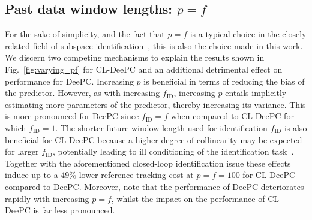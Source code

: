 \subsection{Past data window lengths: $p=f$}
\noindent For the sake of simplicity, and the fact that $p=f$ is a typical choice in the closely related field of subspace identification~\citep{vanderVeen2013}, this is also the choice made in this work. We discern two competing mechanisms to explain the results shown in Fig.~\ref{fig:varying_pf} for \ac{CL-DeePC} and an additional detrimental effect on performance for \ac{DeePC}. Increasing $p$ is beneficial in terms of reducing the bias of the predictor. However, as with increasing $f_\mathrm{ID}$, increasing $p$ entails implicitly estimating more parameters of the predictor, thereby increasing its variance. This is more pronounced for \ac{DeePC} since $f_\mathrm{ID}=f$ when compared to \ac{CL-DeePC} for which $f_\mathrm{ID}=1$. The shorter future window length used for identification $f_\mathrm{ID}$ is also beneficial for \ac{CL-DeePC} because a higher degree of collinearity may be expected for larger $f_\mathrm{ID}$, potentially leading to ill conditioning of the identification task~\citep{Chiuso2004}. Together with the aforementioned closed-loop identification issue these effects induce up to a 49\% lower reference tracking cost at $p=f=100$ for \ac{CL-DeePC} compared to \ac{DeePC}. Moreover, note that the performance of \ac{DeePC} deteriorates rapidly with increasing $p=f$, whilst the impact on the performance of \ac{CL-DeePC} is far less pronounced.
